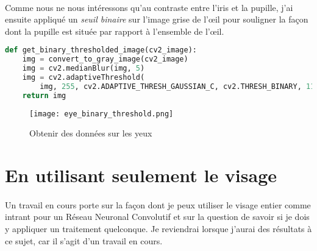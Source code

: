 \clearpage
\paragraph{}
Comme nous ne nous intéressons qu'au contraste entre l'iris et la pupille, j'ai ensuite appliqué un \emph{seuil binaire} sur l'image grise de l'œil pour souligner la façon dont la pupille est située par rapport à l'ensemble de l'œil.

\begin{lstlisting}[language=Python, caption=Application d'un seuil binaire]
def get_binary_thresholded_image(cv2_image):
    img = convert_to_gray_image(cv2_image)
    img = cv2.medianBlur(img, 5)
    img = cv2.adaptiveThreshold(
        img, 255, cv2.ADAPTIVE_THRESH_GAUSSIAN_C, cv2.THRESH_BINARY, 11, 2)
    return img
\end{lstlisting}

\begin{figure}[H]
    \centering
    \texttt{[image: eye\_binary\_threshold.png]}
    \caption{Obtenir des données sur les yeux}
\end{figure}

\section{En utilisant seulement le visage}
\paragraph{}
Un travail en cours porte sur la façon dont je peux utiliser le visage entier comme intrant pour un Réseau Neuronal Convolutif et sur la question de savoir si je dois y appliquer un traitement quelconque.
Je reviendrai lorsque j'aurai des résultats à ce sujet, car il s'agit d'un travail en cours.

